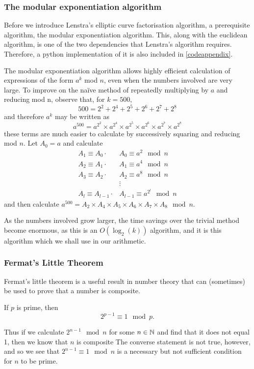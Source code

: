 \subsubsection{The modular exponentiation algorithm}
Before we introduce Lenstra's elliptic curve factorisation algorithm, a prerequisite algorithm, the modular exponentiation algorithm.
This, along with the euclidean algorithm, is one of the two dependencies that Lenstra's algorithm requires.
Therefore, a python implementation of it is also included in \cref{codeappendix}.
\begin{definition}
	The modular exponentiation algorithm allows highly efficient calculation of expressions of the form $a^k$ mod $n$, even when the numbers involved are very large.
	To improve on the naïve method of repeatedly multiplying by $a$ and reducing mod n, observe that, for $k=500$,
$$500=2^2+2^4+2^5+2^6+2^7+2^8$$
and therefore $a^k$ may be written as
$$a^{500} = a^{2^{2}} \times a^{2^{4}} \times a^{2^{5}} \times a^{2^{6}} \times a^{2^{7}} \times a^{2^{8}}$$
these terms are much easier to calculate by successively squaring and reducing mod $n$.
Let $A_0 = a$ and calculate
\begin{align*}
	A_1\equiv A_0\cdot &A_0 \equiv a^2 \mod n\\
	A_2\equiv A_1\cdot &A_1 \equiv a^4 \mod n\\
	A_3\equiv A_2\cdot &A_2 \equiv a^8 \mod n\\
	&\vdots\\
	A_l\equiv A_{l-1}\cdot &A_{l-1} \equiv a^{2^{l}} \mod n
\end{align*}
and then calculate $a^{500} = A_2 \times A_4 \times A_5 \times A_6 \times A_7 \times A_8 \mod n$.
\end{definition}
As the numbers involved grow larger, the time savings over the trivial method become enormous, as this is an $O(\log_2(k))$ algorithm, and it is this algorithm which we shall use in our arithmetic.

\subsubsection{Fermat's Little Theorem}
Fermat's little theorem is a useful result in number theory that can (sometimes) be used to prove that a number is composite.
\begin{theorem}
	If $p$ is prime, then
	$$2^{p-1} \equiv 1 \mod p.$$
\end{theorem}
Thus if we calculate $2^{n-1} \mod n$ for some $n\in\mathbb{N}$ and find that it does not equal 1, then we know that $n$ is composite
The converse statement is not true, however, and so we see that $2^{n-1} \equiv 1 \mod n$ is a necessary but not sufficient condition for $n$ to be prime.


